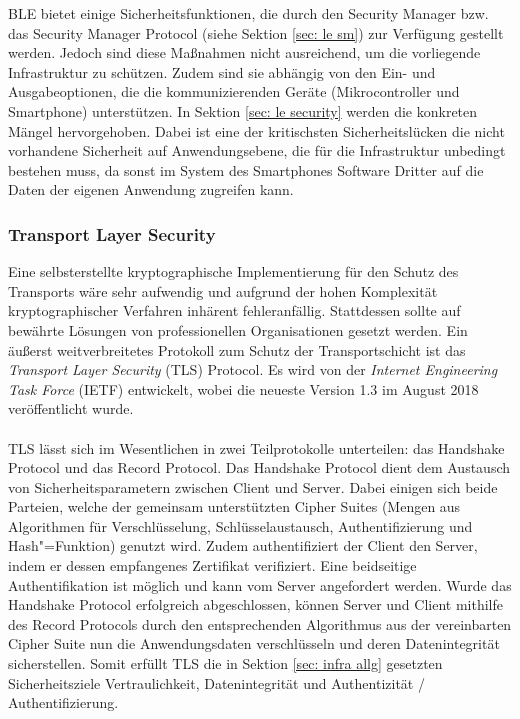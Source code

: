 BLE bietet einige Sicherheitsfunktionen, die durch den Security Manager bzw. das Security Manager Protocol (siehe Sektion \ref{sec: le sm}) zur Verfügung gestellt werden. Jedoch sind diese Maßnahmen nicht ausreichend, um die vorliegende Infrastruktur zu schützen. Zudem sind sie abhängig von den Ein- und Ausgabeoptionen, die die kommunizierenden Geräte (Mikrocontroller und Smartphone) unterstützen. In Sektion \ref{sec: le security} werden die konkreten Mängel hervorgehoben. Dabei ist eine der kritischsten Sicherheitslücken die nicht vorhandene Sicherheit auf Anwendungsebene, die für die Infrastruktur unbedingt bestehen muss, da sonst im System des Smartphones Software Dritter auf die Daten der eigenen Anwendung zugreifen kann.

\subsubsection{Transport Layer Security}
Eine selbsterstellte kryptographische Implementierung für den Schutz des Transports wäre sehr aufwendig und aufgrund der hohen Komplexität kryptographischer Verfahren inhärent fehleranfällig. Stattdessen sollte auf bewährte Lösungen von professionellen Organisationen gesetzt werden. Ein äußerst weitverbreitetes Protokoll zum Schutz der Transportschicht ist das \textit{Transport Layer Security} (TLS) Protocol. Es wird von der \textit{Internet Engineering Task Force} (IETF) entwickelt, wobei die neueste Version 1.3 im August 2018 veröffentlicht wurde.
\\\\
TLS lässt sich im Wesentlichen in zwei Teilprotokolle unterteilen: das Handshake Protocol und das Record Protocol. Das Handshake Protocol dient dem Austausch von Sicherheitsparametern zwischen Client und Server. Dabei einigen sich beide Parteien, welche der gemeinsam unterstützten Cipher Suites (Mengen aus Algorithmen für Verschlüsselung, Schlüsselaustausch, Authentifizierung und Hash"=Funktion) genutzt wird. Zudem authentifiziert der Client den Server, indem er dessen empfangenes Zertifikat verifiziert. Eine beidseitige Authentifikation ist möglich und kann vom Server angefordert werden. Wurde das Handshake Protocol erfolgreich abgeschlossen, können Server und Client mithilfe des Record Protocols durch den entsprechenden Algorithmus aus der vereinbarten Cipher Suite nun die Anwendungsdaten verschlüsseln und deren Datenintegrität sicherstellen. Somit erfüllt TLS die in Sektion \ref{sec: infra allg} gesetzten Sicherheitsziele Vertraulichkeit, Datenintegrität und Authentizität / Authentifizierung. \cite{RFC8446_24-33}
